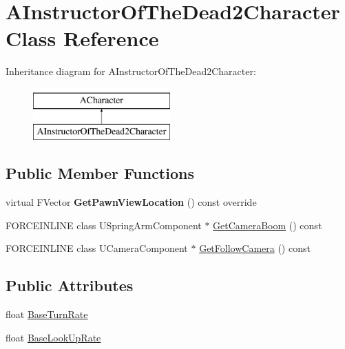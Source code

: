 \hypertarget{class_a_instructor_of_the_dead2_character}{}\section{A\+Instructor\+Of\+The\+Dead2\+Character Class Reference}
\label{class_a_instructor_of_the_dead2_character}
Inheritance diagram for A\+Instructor\+Of\+The\+Dead2\+Character\+:\begin{figure}[H]
\begin{center}
\leavevmode
\includegraphics[height=2.000000cm]{class_a_instructor_of_the_dead2_character}
\end{center}
\end{figure}
\subsection*{Public Member Functions}
\begin{DoxyCompactItemize}
\item 
\mbox{\label{class_a_instructor_of_the_dead2_character_a4b8d6b1af2b365ed2a3cf737d22ba55b}} 
virtual F\+Vector {\bfseries Get\+Pawn\+View\+Location} () const override
\item 
F\+O\+R\+C\+E\+I\+N\+L\+I\+NE class U\+Spring\+Arm\+Component $\ast$ \mbox{\hyperlink{class_a_instructor_of_the_dead2_character_ad5bcd22697b38d057ef996ccb70dc764}{Get\+Camera\+Boom}} () const
\item 
F\+O\+R\+C\+E\+I\+N\+L\+I\+NE class U\+Camera\+Component $\ast$ \mbox{\hyperlink{class_a_instructor_of_the_dead2_character_a8f18771c845fc64a4446f294e7e6900a}{Get\+Follow\+Camera}} () const
\end{DoxyCompactItemize}
\subsection*{Public Attributes}
\begin{DoxyCompactItemize}
\item 
float \mbox{\hyperlink{class_a_instructor_of_the_dead2_character_a145d6b8d0339f10ea25c4fc746b190c2}{Base\+Turn\+Rate}}
\item 
float \mbox{\hyperlink{class_a_instructor_of_the_dead2_character_ab286e704f971b49ef302350c50491b19}{Base\+Look\+Up\+Rate}}
\end{DoxyCompactItemize}
